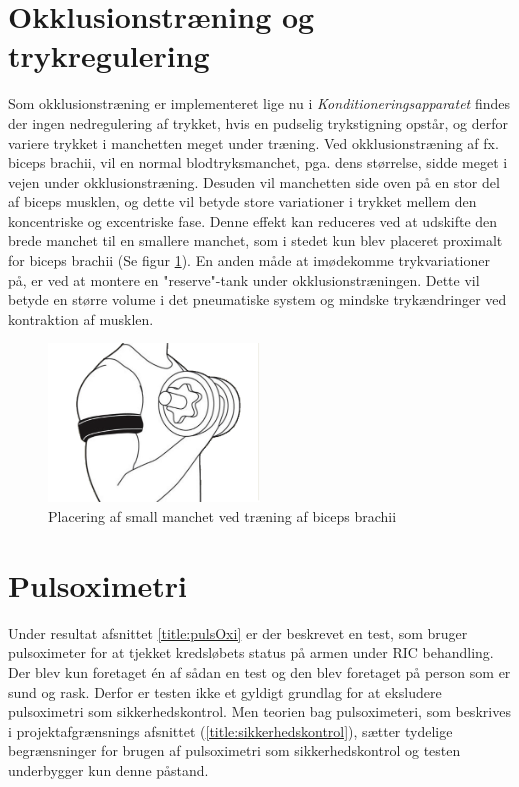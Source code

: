 \section{Okklusionstræning og trykregulering}
Som okklusionstræning er implementeret lige nu i \textit{Konditioneringsapparatet} findes der ingen nedregulering af trykket, hvis en pudselig trykstigning opstår, og derfor variere trykket i manchetten meget under træning. Ved okklusionstræning af fx. biceps brachii, vil en normal blodtryksmanchet, pga. dens størrelse, sidde meget i vejen under okklusionstræning. Desuden vil manchetten side oven på en stor del af biceps musklen, og dette vil betyde store variationer i trykket mellem den koncentriske og excentriske fase. Denne effekt kan reduceres ved at udskifte den brede manchet til en smallere manchet, som i stedet kun blev placeret proximalt for biceps brachii (Se figur \ref{fig:okklcuff}). En anden måde at imødekomme trykvariationer på, er ved at montere en "reserve"-tank under okklusionstræningen. Dette vil betyde en større volume i det pneumatiske system og mindske trykændringer ved kontraktion af musklen. 
\begin{figure}[H]
	\centering
	\includegraphics[trim={1.5cm 0 1.5cm 0}, clip, width=0.5\textwidth]{billeder/okklusionCuff.png}
	\caption{Placering af small manchet ved træning af biceps brachii}\label{fig:okklcuff}
\end{figure}

\section{Pulsoximetri}
Under resultat afsnittet \ref{title:pulsOxi} er der beskrevet en test, som bruger pulsoximeter for at tjekket kredsløbets status på armen under RIC behandling. Der blev kun foretaget én af sådan en test og den blev foretaget på person som er sund og rask. Derfor er testen ikke et gyldigt grundlag for at eksludere pulsoximetri som sikkerhedskontrol. Men teorien bag pulsoximeteri, som beskrives i projektafgrænsnings afsnittet (\ref{title:sikkerhedskontrol}), sætter tydelige begrænsninger for brugen af pulsoximetri som sikkerhedskontrol og testen underbygger kun denne påstand. 

